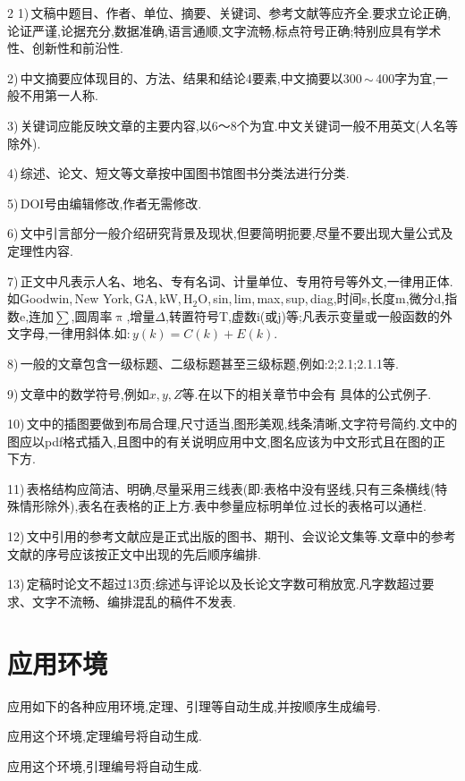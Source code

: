\documentclass[authordraft]{ctacn}%
\begin{document}
\begin{multicols}{2}
1)\,文稿中题目、作者、单位、摘要、关键词、参考文献等应齐全.\;要求立论正确,论证严谨,论据充分,数据准确,语言通顺,文字流畅,标点符号正确;特别应具有学术性、创新性和前沿性.

2)\,中文摘要应体现目的、方法、结果和结论4要素,中文摘要以300\,$\sim$\,400字为宜,一般不用第一人称.

3)\,关键词应能反映文章的主要内容,以6～8个为宜.\;中文关键词一般不用英文(人名等除外).

4)\,综述、论文、短文等文章按中国图书馆图书分类法进行分类.

5)\,DOI号由编辑修改,作者无需修改.

6)\,文中引言部分一般介绍研究背景及现状,但要简明扼要,尽量不要出现大量公式及定理性内容.

7)\,正文中凡表示人名、地名、专有名词、计量单位、专用符号等外文,一律用正体.\;如Goodwin,\,New York,\,GA,\,kW,\,H$_2$O,\,sin,\,lim,\,max,\,sup,\,diag,时间s,长度m,微分d,指数e,连加$\sum$,圆周率$\uppi$,增量$\Delta$,转置符号T,虚数i(或j)等;凡表示变量或一般函数的外文字母,一律用斜体.\;如:\,$y(k)=C(k)+E(k)$.

8)\,一般的文章包含一级标题、二级标题甚至三级标题,例如:2;2.1;2.1.1等.

9)\,文章中的数学符号,例如$x, y, Z$等.在以下的相关章节中会有
具体的公式例子.

10)\,文中的插图要做到布局合理,尺寸适当,图形美观,线条清晰,文字符号简约.文中的图应以pdf格式插入,且图中的有关说明应用中文,图名应该为中文形式且在图的正下方.

11)\,表格结构应简洁、明确,尽量采用三线表(即:表格中没有竖线,只有三条横线(特殊情形除外),表名在表格的正上方.\;表中参量应标明单位.\;过长的表格可以通栏.

12)\,文中引用的参考文献应是正式出版的图书、期刊、会议论文集等.\;文章中的参考文献的序号应该按正文中出现的先后顺序编排.



13)\,定稿时论文不超过13页;综述与评论以及长论文字数可稍放宽.\;凡字数超过要求、文字不流畅、编排混乱的稿件不发表.

\section{应用环境}
应用如下的各种应用环境,定理、引理等自动生成,并按顺序生成编号.

\begin{dingli}
	应用这个环境,定理编号将自动生成.
\end{dingli}

\begin{yinli}
	应用这个环境,引理编号将自动生成.
\end{yinli}


\end{multicols}
\end{document}
